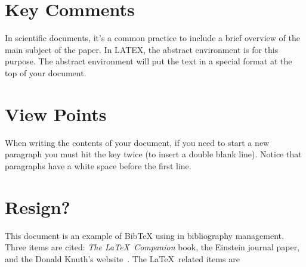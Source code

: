 \documentclass[12pt,legalpaper]{article}
\begin{document}
\begin{titlepage}
  \maketitle
  \tableofcontents
\end{titlepage}
\section{Key Comments}
\par %
In scientific documents, it's a common practice to include a brief overview of the main subject of the paper. In LATEX, the abstract environment is for this purpose. The abstract environment will put the text in a special format at the top of your document.
\section{View Points}
\par %
When writing the contents of your document, if you need to start a new paragraph you must hit the  key twice (to insert a double blank line). Notice that paragraphs have a white space before the first line.
\section{Resign?}
\par %
This document is an example of BibTeX using in bibliography management. Three items are cited: \textit{The \LaTeX\ Companion} book, the Einstein journal paper, and the Donald Knuth's website\ \cite{assignment1}. The \LaTeX\ related items are
\clearpage
\printbibliography\
\end{document}
